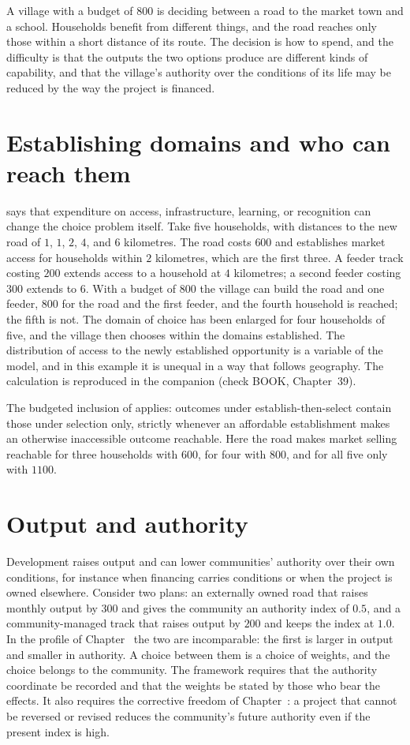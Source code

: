 A village with a budget of $800$ is deciding between a road to the market town and a school. Households benefit from different things, and the road reaches only those within a short distance of its route. The decision is how to spend, and the difficulty is that the outputs the two options produce are different kinds of capability, and that the village's authority over the conditions of its life may be reduced by the way the project is financed.

\section{Establishing domains and who can reach them}

 says that expenditure on access, infrastructure, learning, or recognition can change the choice problem itself. Take five households, with distances to the new road of $1$, $1$, $2$, $4$, and $6$ kilometres. The road costs $600$ and establishes market access for households within $2$ kilometres, which are the first three. A feeder track costing $200$ extends access to a household at $4$ kilometres; a second feeder costing $300$ extends to $6$. With a budget of $800$ the village can build the road and one feeder, $800$ for the road and the first feeder, and the fourth household is reached; the fifth is not. The domain of choice has been enlarged for four households of five, and the village then chooses within the domains established. The distribution of access to the newly established opportunity is a variable of the model, and in this example it is unequal in a way that follows geography. The calculation is reproduced in the companion (check BOOK, Chapter~39).

The budgeted inclusion of  applies: outcomes under establish-then-select contain those under selection only, strictly whenever an affordable establishment makes an otherwise inaccessible outcome reachable. Here the road makes market selling reachable for three households with $600$, for four with $800$, and for all five only with $1100$.

\section{Output and authority}

Development raises output and can lower communities' authority over their own conditions, for instance when financing carries conditions or when the project is owned elsewhere. Consider two plans: an externally owned road that raises monthly output by $300$ and gives the community an authority index of $0.5$, and a community-managed track that raises output by $200$ and keeps the index at $1.0$. In the profile of Chapter~ the two are incomparable: the first is larger in output and smaller in authority. A choice between them is a choice of weights, and the choice belongs to the community. The framework requires that the authority coordinate be recorded and that the weights be stated by those who bear the effects. It also requires the corrective freedom of Chapter~: a project that cannot be reversed or revised reduces the community's future authority even if the present index is high.

